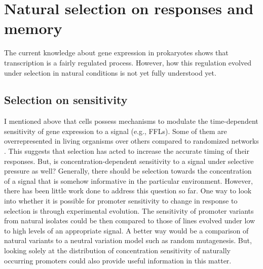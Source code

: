\section{Natural selection on responses and memory}
The current knowledge about gene expression in prokaryotes shows that transcription is a fairly regulated process.
However, how this regulation evolved under selection in natural conditions is not yet fully understood yet.

\subsection{Selection on sensitivity}
I mentioned above that cells possess mechanisms to modulate the time-dependent sensitivity of gene expression to a signal (e.g., FFLs).
Some of them are overrepresented in living organisms over others compared to randomized networks \cite{shen2002network, mangan2003structure}.
This suggests that selection has acted to increase the accurate timing of their responses.
But, is concentration-dependent sensitivity to a signal under selective pressure as well?
Generally, there should be selection towards the concentration of a signal that is somehow informative in the particular environment.
However, there has been little work done to address this question so far.
One way to look into whether it is possible for promoter sensitivity to change in response to selection is through experimental evolution.
The sensitivity of promoter variants from natural isolates could be then compared to those of lines evolved under low to high levels of an appropriate signal.
A better way would be a comparison of natural variants to a neutral variation model such as random mutagenesis.
But, looking solely at the distribution of concentration sensitivity of naturally occurring promoters could also provide useful information in this matter.


